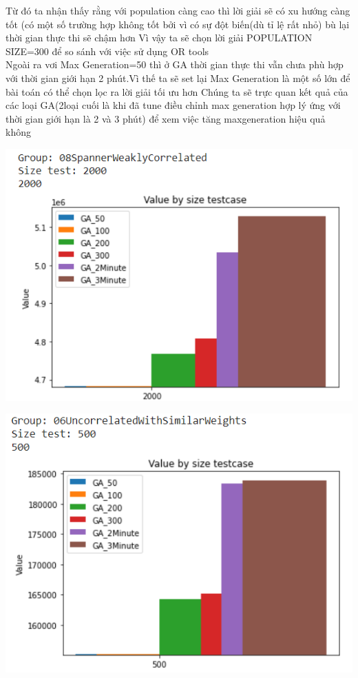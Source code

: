 \documentclass{article}
\begin{document}
Từ đó ta nhận thấy rằng với population càng cao thì lời giải sẽ có xu hướng càng tốt (có một số trường hợp không tốt bởi vì có sự đột biến(dù tỉ lệ rất nhỏ) bù lại thời gian thực thi sẽ chậm hơn
Vì vậy ta sẽ chọn lời giải POPULATION SIZE=300 để so sánh với việc sử dụng OR tools
\\
Ngoài ra vơi Max Generation=50 thì ở GA thời gian thực thi vẫn chưa phù hợp với thời gian giới hạn 2 phút.Vì thế ta sẽ set lại Max Generation là một số lớn để bài toán có thể chọn lọc ra lời giải tối ưu hơn
Chúng ta sẽ trực quan kết quả của các loại GA(2loại cuối là khi đã tune điều chỉnh max generation hợp lý ứng với thời gian giới hạn là 2 và 3 phút) để xem việc tăng maxgeneration hiệu quả không
\begin{center}
    \centering
    \includegraphics[width=15cm]{image/AI5.png}
\end{center}
\begin{center}
    \centering
    \includegraphics[width=15cm]{image/AI6.png}
\end{center}
\end{document}
